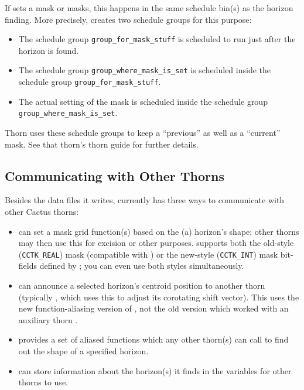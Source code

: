 If  sets a mask or masks, this happens in the
same schedule bin(s) as the horizon finding.  More precisely,
 creates two schedule groups for this purpose:
\begin{itemize}
\item	The schedule group \verb|group_for_mask_stuff| is
	scheduled to run just after the horizon is found.
\item	The schedule group \verb|group_where_mask_is_set|
	is scheduled inside the schedule group \verb|group_for_mask_stuff|.
\item	The actual setting of the mask is scheduled inside
	the schedule group \verb|group_where_mask_is_set|.
\end{itemize}
Thorn  uses these schedule groups to keep a
``previous'' as well as a ``current'' mask.  See that thorn's thorn
guide for further details.


\subsection{Communicating with Other Thorns}
\label{AHFinderDirect/sect-parameters/communicating-with-other-thorns}

Besides the data files it writes,  currently
has three ways to communicate with other Cactus thorns:
\begin{itemize}
\item	{} can set a mask grid function(s) based
	on the (a) horizon's shape; other thorns may then use this for
	excision or other purposes.   supports
	both the old-style (\verb|CCTK_REAL|) mask
	(compatible with ) or
	the new-style (\verb|CCTK_INT|) mask bit-fields defined by
	; you can even use both styles simultaneously.
\item	{} can announce a selected horizon's centroid
	position to another thorn (typically , which
	uses this to adjust its corotating shift vector).
	This uses the new function-aliasing version of ,
	not the old version which worked with an auxiliary thorn
	.
\item	{} provides a set of aliased functions
	which any other thorn(s) can call to find out the shape of
	a specified horizon.
\item	{} can store information about the
	horizon(s) it finds in the  variables
	for other thorns to use.
\end{itemize}

